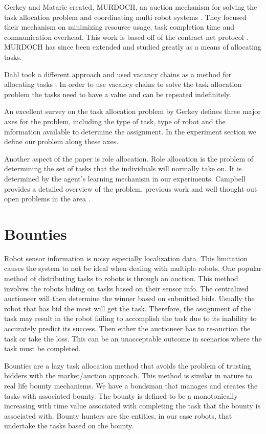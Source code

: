 \documentclass[twocolumn]{article}
\begin{document}
Gerkey and Mataric created, MURDOCH, an auction mechanism for solving the task allocation problem and coordinating multi robot systems \cite{Gerkey2002c}.  They focused their mechanism on minimizing resource usage, task completion time and communication overhead.  This work is based off of the contract net protocol \cite{Davis1983}.  MURDOCH has since been extended and studied greatly as a means of allocating tasks.

Dahl took a different approach and used vacancy chains as a method for allocating tasks \cite{Dahl2003}.  In order to use vacancy chains to solve the task allocation problem the tasks need to have a value and can be repeated indefinitely.  

An excellent survey on the task allocation problem by Gerkey \cite{Gerkey2004} defines three major axes for the problem, including the type of task, type of robot and the information available to determine the assignment.  In the experiment section we define our problem along these axes.  

Another aspect of the paper is role allocation.  Role allocation is the problem of determining the set of tasks that the individuals will normally take on.  It is determined by the agent's learning mechanism in our experiments. Campbell provides a detailed overview of the problem, previous  work and well thought out open problems in the area \cite{Campbell2010}.

\section{Bounties}
Robot sensor information is noisy especially localization data.  This limitation causes the system to not be ideal when dealing with multiple robots.  One popular method of distributing tasks to robots is through an auction.  This method involves the robots biding on tasks based on their sensor info.  The centralized auctioneer will then determine the winner based on submitted bids.  Usually the robot that has bid the most will get the task.  Therefore, the assignment of the task may result in the robot failing to accomplish the task due to its inability to accurately predict its success.  Then either the auctioneer has to re-auction the task or take the loss.  This can be an unacceptable outcome in scenarios where the task must be completed.

Bounties are a lazy task allocation method that avoids the problem of trusting bidders with the market/auction approach.  This method is similar in nature to real life bounty mechanisms.  We have a bondsman that manages and creates the tasks with associated bounty.  The bounty is defined to be a monotonically increasing with time value associated with completing the task that the bounty is associated with.  Bounty hunters are the entities, in our case robots, that undertake the tasks based on the bounty.
\end{document}
